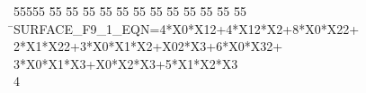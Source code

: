 %
%
\begin{tabbing}
55555 \= 55 \= 55 \= 55 \= 55 \= 55 \= 55 \= 55 \= 55 \= 55 \= 55 \= 55 \= 55 \= \>SURFACE\_F9\_1\_EQN=4*X0*X12+4*X12*X2+8*X0*X22+\\[0pt]
2*X1*X22+3*X0*X1*X2+X02*X3+6*X0*X32+\\[0pt]
3*X0*X1*X3+X0*X2*X3+5*X1*X2*X3\\[0pt]
4\>\end{tabbing}
